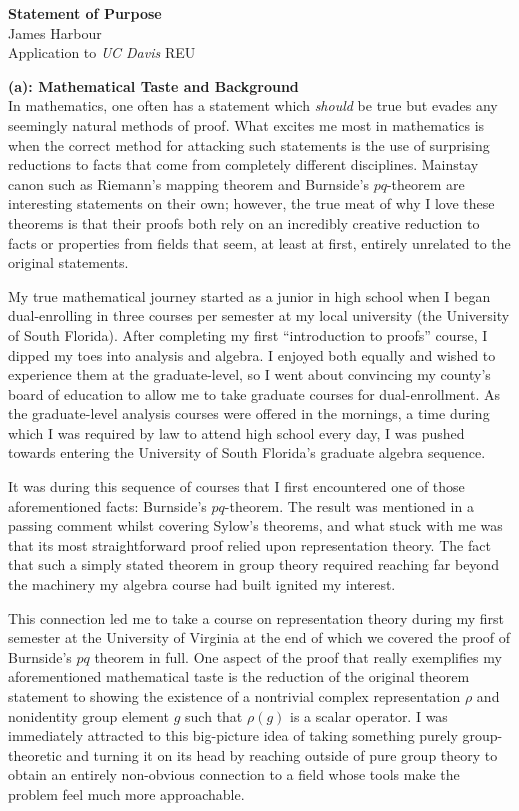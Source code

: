 \documentclass[11pt]{article}
\begin{document}
\begin{center}
  \textbf{Statement of Purpose}\\
  James Harbour \\
  Application to \emph{UC Davis} REU
\end{center}





\noindent\textbf{(a): Mathematical Taste and Background}\\

In mathematics, one often has a statement which \emph{should} be true but evades any seemingly natural methods of proof. What excites me most in mathematics is when the correct method for attacking such statements is the use of surprising reductions to facts that come from completely different disciplines. Mainstay canon such as Riemann's mapping theorem and Burnside's $pq$-theorem are interesting statements on their own; however, the true meat of why I love these theorems is that their proofs both rely on an incredibly creative reduction to facts or properties from fields that seem, at least at first, entirely unrelated to the original statements.

My true mathematical journey started as a junior in high school when I began dual-enrolling in three courses per semester at my local university (the University of South Florida). After completing my first ``introduction to proofs'' course, I dipped my toes into analysis and algebra. I enjoyed both equally and wished to experience them at the graduate-level, so I went about convincing my county's board of education to allow me to take graduate courses for dual-enrollment. As the graduate-level analysis courses were offered in the mornings, a time during which I was required by law to attend high school every day, I was pushed towards entering the University of South Florida's graduate algebra sequence.

It was during this sequence of courses that I first encountered one of those aforementioned facts: Burnside's $pq$-theorem. The result was mentioned in a passing comment whilst covering Sylow's theorems, and what stuck with me was that its most straightforward proof relied upon representation theory. The fact that such a simply stated theorem in group theory required reaching far beyond the machinery my algebra course had built ignited my interest.

This connection led me to take a course on representation theory during my first semester at the University of Virginia at the end of which we covered the proof of Burnside's $pq$ theorem in full. One aspect of the proof that really exemplifies my aforementioned mathematical taste is the reduction of the original theorem statement to showing the existence of a nontrivial complex representation $\rho$ and nonidentity group element $g$ such that $\rho(g)$ is a scalar operator. I was immediately attracted to this big-picture idea of taking something purely group-theoretic and turning it on its head by reaching outside of pure group theory to obtain an entirely non-obvious connection to a field whose tools make the problem feel much more approachable.
\end{document}
